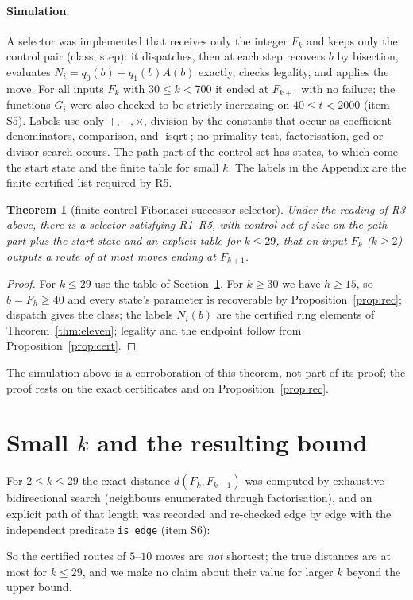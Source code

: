 \documentclass[11pt]{article}
\newtheorem{theorem}{Theorem}
\theoremstyle{definition}
\theoremstyle{remark}
\DeclareMathOperator{\isqrt}{isqrt}
\begin{document}
\paragraph{Simulation.} A selector was implemented that receives only the integer $F_k$ and keeps only the control pair (class, step): it dispatches, then at each step recovers $b$ by bisection, evaluates $N_i=q_0(b)+q_1(b)A(b)$ exactly, checks legality, and applies the move. For all \NSelTest{} inputs $F_k$ with $30\le k<700$ it ended at $F_{k+1}$ with no failure; the functions $G_i$ were also checked to be strictly increasing on $40\le t<2000$ (item S5). Labels use only $+,-,\times$, division by the constants \DenList{} that occur as coefficient denominators, comparison, and $\isqrt$; no primality test, factorisation, gcd or divisor search occurs. The path part of the control set has \CtlStates{} states, to which come the start state and the finite table for small $k$. The labels in the Appendix are the finite certified list required by R5.

\begin{theorem}[finite-control Fibonacci successor selector]\label{thm:sel}
Under the reading of R3 above, there is a selector satisfying R1--R5, with control set of size \CtlStates{} on the path part plus the start state and an explicit table for $k\le 29$, that on input $F_k$ ($k\ge 2$) outputs a route of at most \MaxLen{} moves ending at $F_{k+1}$.
\end{theorem}
\begin{proof}
For $k\le29$ use the table of Section~\ref{sec:small}. For $k\ge30$ we have $h\ge15$, so $b=F_h\ge 40$ and every state's parameter is recoverable by Proposition~\ref{prop:rec}; dispatch gives the class; the labels $N_i(b)$ are the certified ring elements of Theorem~\ref{thm:eleven}; legality and the endpoint follow from Proposition~\ref{prop:cert}.
\end{proof}
The simulation above is a corroboration of this theorem, not part of its proof; the proof rests on the exact certificates and on Proposition~\ref{prop:rec}.

\section{Small \texorpdfstring{$k$}{k} and the resulting bound}\label{sec:small}
For $2\le k\le 29$ the exact distance $d(F_k,F_{k+1})$ was computed by exhaustive bidirectional search (neighbours enumerated through factorisation), and an explicit path of that length was recorded and re-checked edge by edge with the independent predicate \texttt{is\_edge} (item S6):
\begin{center}\end{center}
So the certified routes of $5$--$10$ moves are \emph{not} shortest; the true distances are at most \NSmallMax{} for $k\le29$, and we make no claim about their value for larger $k$ beyond the upper bound.
\end{document}

